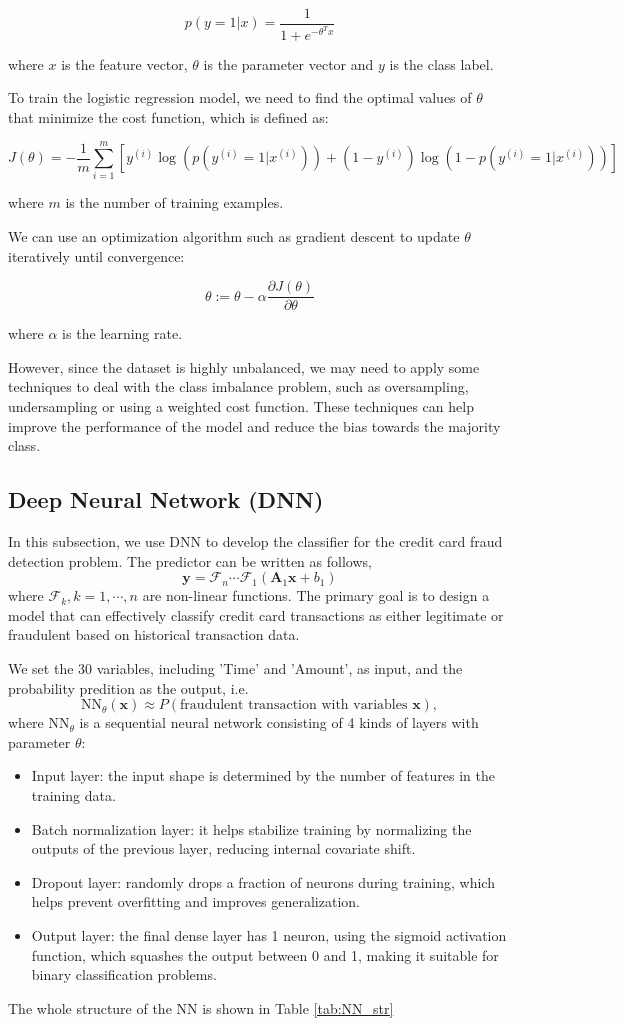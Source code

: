 \[p(y=1|x) = \frac{1}{1+e^{-\theta^Tx}}\]

where $x$ is the feature vector, $\theta$ is the parameter vector and $y$ is the class label.

To train the logistic regression model, we need to find the optimal values of $\theta$ that minimize the cost function, which is defined as:

\[J(\theta) = -\frac{1}{m}\sum_{i=1}^m[y^{(i)}\log(p(y^{(i)}=1|x^{(i)}))+(1-y^{(i)})\log(1-p(y^{(i)}=1|x^{(i)}))]\]

where $m$ is the number of training examples.

We can use an optimization algorithm such as gradient descent to update $\theta$ iteratively until convergence:

\[\theta := \theta - \alpha \frac{\partial J(\theta)}{\partial \theta}\]

where $\alpha$ is the learning rate.

However, since the dataset is highly unbalanced, we may need to apply some techniques to deal with the class imbalance problem, such as oversampling, undersampling or using a weighted cost function. These techniques can help improve the performance of the model and reduce the bias towards the majority class.


\subsection{Deep Neural Network (DNN)}
In this subsection, we use DNN to develop the classifier for the credit card fraud detection problem. The predictor can be written as follows,
\[\mathbf{y} = \mathcal{F}_n\cdots\mathcal{F}_1(\mathbf{A}_1\mathbf{x}+b_1)\]
where $\mathcal{F}_k, k=1,\cdots,n$ are non-linear functions. The primary goal is to design a model that can effectively classify credit card transactions as either legitimate or fraudulent based on historical transaction data.

We set the 30 variables, including 'Time' and 'Amount', as input, and the probability predition as the output, i.e.
\[\mathrm{NN}_\theta(\mathbf{x})\approx P(\mbox{fraudulent transaction with variables } \mathbf{x}),\]
where $\mathrm{NN}_\theta$ is a sequential neural network consisting of 4 kinds of layers with parameter $\theta$:
\begin{itemize}
	\item Input layer: the input shape is determined by the number of features in the training data.
	\item Batch normalization layer: it helps stabilize training by normalizing the outputs of the previous layer, reducing internal covariate shift.
	\item Dropout layer: randomly drops a fraction of neurons during training, which helps prevent overfitting and improves generalization.
	\item Output layer: the final dense layer has 1 neuron, using the sigmoid activation function, which squashes the output between 0 and 1, making it suitable for binary classification problems.
\end{itemize}
The whole structure of the NN is shown in Table \ref{tab:NN_str}

